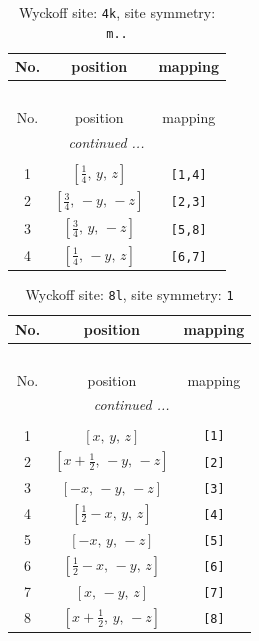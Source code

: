 \documentclass[fleqn,8pt]{jsarticle}
\begin{document}
\renewcommand{\arraystretch}{1.2}
\begin{longtable}{ccc}
\caption{Wyckoff site: {\tt 4k}, site symmetry: {\tt m..}}
 \\
 \hline \hline
No. & position & mapping \\ \hline \endfirsthead

\multicolumn{2}{l}{\tablename\ \thetable{}} \\
 \hline \hline
No. & position & mapping \\ \hline \endhead

 \hline \hline
\multicolumn{2}{r}{\footnotesize\it continued ...} \\ \endfoot

 \hline \hline
\multicolumn{2}{r}{} \\ \endlastfoot

1 & $\left[ \frac{1}{4},\, y,\, z \right]$ & {\tt [1,4]} \\ \hline
2 & $\left[ \frac{3}{4},\, - y,\, - z \right]$ & {\tt [2,3]} \\ \hline
3 & $\left[ \frac{3}{4},\, y,\, - z \right]$ & {\tt [5,8]} \\ \hline
4 & $\left[ \frac{1}{4},\, - y,\, z \right]$ & {\tt [6,7]} \\
\end{longtable}
\renewcommand{\arraystretch}{1.2}
\begin{longtable}{ccc}
\caption{Wyckoff site: {\tt 8l}, site symmetry: {\tt 1}}
 \\
 \hline \hline
No. & position & mapping \\ \hline \endfirsthead

\multicolumn{2}{l}{\tablename\ \thetable{}} \\
 \hline \hline
No. & position & mapping \\ \hline \endhead

 \hline \hline
\multicolumn{2}{r}{\footnotesize\it continued ...} \\ \endfoot

 \hline \hline
\multicolumn{2}{r}{} \\ \endlastfoot

1 & $\left[ x,\, y,\, z \right]$ & {\tt [1]} \\ \hline
2 & $\left[ x + \frac{1}{2},\, - y,\, - z \right]$ & {\tt [2]} \\ \hline
3 & $\left[ - x,\, - y,\, - z \right]$ & {\tt [3]} \\ \hline
4 & $\left[ \frac{1}{2} - x,\, y,\, z \right]$ & {\tt [4]} \\ \hline
5 & $\left[ - x,\, y,\, - z \right]$ & {\tt [5]} \\ \hline
6 & $\left[ \frac{1}{2} - x,\, - y,\, z \right]$ & {\tt [6]} \\ \hline
7 & $\left[ x,\, - y,\, z \right]$ & {\tt [7]} \\ \hline
8 & $\left[ x + \frac{1}{2},\, y,\, - z \right]$ & {\tt [8]} \\
\end{longtable}
\end{document}
